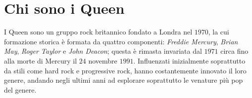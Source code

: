 \documentclass[12pt]{article}
\begin{document}

\newpage

\setcounter{page}{1}

\section{Chi sono i Queen}
I Queen sono un gruppo rock britannico fondato a Londra nel \(1970\), la cui formazione storica è formata da quattro componenti: \emph{Freddie Mercury}, \emph{Brian May}, \emph{Roger Taylor} e \emph{John Deacon}; questa è rimasta invariata dal \(1971\) circa fino alla morte di Mercury il \(24\) novembre \(1991\). Influenzati inizialmente soprattutto da stili come hard rock e progressive rock, hanno costantemente innovato il loro genere, andando negli ultimi anni ad esplorare soprattutto le venature più pop del genere.
\end{document}
